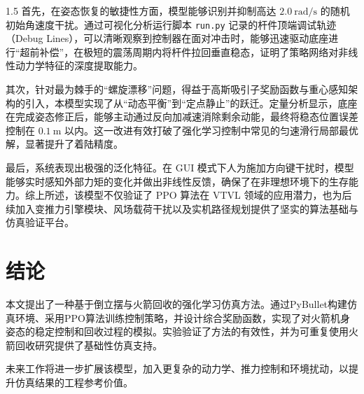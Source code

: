 \documentclass[zihao=-4]{ctexart}
\begin{document}
\begin{spacing}{1.5}
首先，在姿态恢复的敏捷性方面，模型能够识别并抑制高达 $2.0\ \mathrm{rad/s}$ 的随机初始角速度干扰。通过可视化分析运行脚本 \texttt{run.py} 记录的杆件顶端调试轨迹（Debug Lines），可以清晰观察到控制器在面对冲击时，能够迅速驱动底座进行“超前补偿”，在极短的震荡周期内将杆件拉回垂直稳态，证明了策略网络对非线性动力学特征的深度提取能力。

其次，针对最为棘手的“螺旋漂移”问题，得益于高斯吸引子奖励函数与重心感知架构的引入，本模型实现了从“动态平衡”到“定点静止”的跃迁。定量分析显示，底座在完成姿态修正后，能够主动通过反向加减速消除剩余动能，最终将稳态位置误差控制在 $0.1\ \mathrm{m}$ 以内。这一改进有效打破了强化学习控制中常见的匀速滑行局部最优解，显著提升了着陆精度。

最后，系统表现出极强的泛化特征。在 GUI 模式下人为施加方向键干扰时，模型能够实时感知外部力矩的变化并做出非线性反馈，确保了在非理想环境下的生存能力。综上所述，该模型不仅验证了 PPO 算法在 VTVL 领域的应用潜力，也为后续加入变推力引擎模块、风场载荷干扰以及实机路径规划提供了坚实的算法基础与仿真验证平台。

\end{spacing}

\section*{结论}%
本文提出了一种基于倒立摆与火箭回收的强化学习仿真方法。通过PyBullet构建仿真环境、采用PPO算法训练控制策略，并设计综合奖励函数，实现了对火箭机身姿态的稳定控制和回收过程的模拟。实验验证了方法的有效性，并为可重复使用火箭回收研究提供了基础性仿真支持。

未来工作将进一步扩展该模型，加入更复杂的动力学、推力控制和环境扰动，以提升仿真结果的工程参考价值。

\newpage


 

 

\newpage
\end{document}
